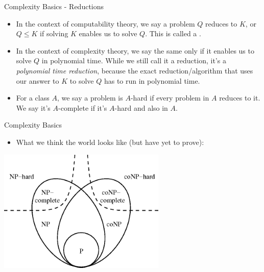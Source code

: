 \documentclass[aspectratio=169]{beamer}
\begin{document}
\begin{frame}{Complexity Basics - Reductions}
  
  \begin{itemize}
    \item In the context of computability theory, we say a problem $Q$ reduces to $K$, or $Q \leq K$ if solving $K$ enables us to solve $Q$. This is called a . \pause
    \item In the context of complexity theory, we say the same only if it enables us to solve $Q$ in polynomial time. While we still call it a reduction, it's a \emph{polynomial time reduction}, because the exact reduction/algorithm that uses our answer to $K$ to solve $Q$ has to run in polynomial time. \pause
    \item For a class $A$, we say a problem is $A$-hard if every problem in $A$ reduces to it. We say it's $A$-complete if it's $A$-hard and also in $A$.
  \end{itemize}
\end{frame}

\begin{frame}{Complexity Basics}
  
  \begin{itemize}
    \item What we think the world looks like (but have yet to prove):
  \end{itemize}
  \begin{center}
    \includegraphics[width=0.6\textwidth, height=0.6\textheight, keepaspectratio]{PNP.png}
  \end{center}
\end{frame}
\end{document}
